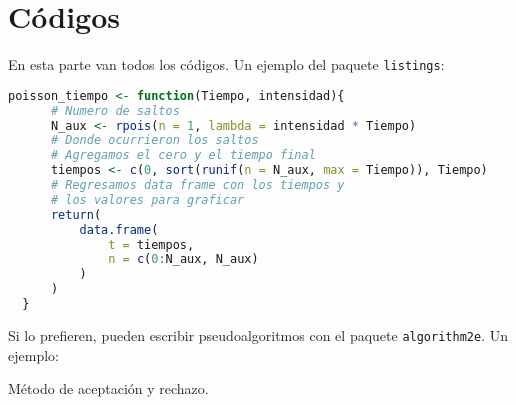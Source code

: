 \chapter{Códigos}

\noindent En esta parte van todos los códigos. Un ejemplo del paquete \texttt{listings}:

\begin{lstlisting}[language=R]
  poisson_tiempo <- function(Tiempo, intensidad){
      # Numero de saltos
      N_aux <- rpois(n = 1, lambda = intensidad * Tiempo)
      # Donde ocurrieron los saltos
      # Agregamos el cero y el tiempo final
      tiempos <- c(0, sort(runif(n = N_aux, max = Tiempo)), Tiempo)
      # Regresamos data frame con los tiempos y 
      # los valores para graficar
      return(
          data.frame(
              t = tiempos,
              n = c(0:N_aux, N_aux)
          )
      )
  }
\end{lstlisting}

Si lo prefieren, pueden escribir pseudoalgoritmos con el paquete \texttt{algorithm2e}. Un ejemplo:

\begin{algorithm}[H]
  \caption{Método de aceptación y rechazo.}
\end{algorithm}